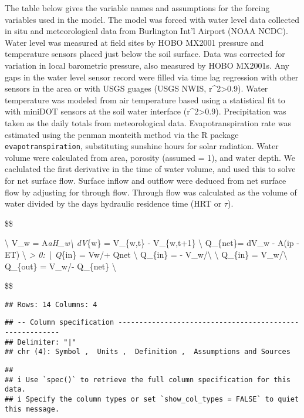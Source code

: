 \documentclass[
]{article}
\begin{document}
The table below gives the variable names and assumptions for the forcing
variables used in the model. The model was forced with water level data
collected in situ and meteorological data from Burlington Int'l Airport
(NOAA NCDC). Water level was measured at field sites by HOBO MX2001
pressure and temperature sensors placed just below the soil surface.
Data was corrected for variation in local barometric pressure, also
measured by HOBO MX2001s. Any gaps in the water level sensor record were
filled via time lag regression with other sensors in the area or with
USGS guages (USGS NWIS, r\^{}2\textgreater0.9). Water temperature was
modeled from air temperature based using a statistical fit to with
miniDOT sensors at the soil water interface (r\^{}2\textgreater0.9).
Precipitation was taken as the daily totals from meteorological data.
Evapotranspiration rate was estimated using the penman monteith method
via the R package \texttt{evapotranspiration}, substituting sunshine
hours for solar radiation. Water volume were calculated from area,
porosity (assumed = 1), and water depth. We caclulated the first
derivative in the time of water volume, and used this to solve for net
surface flow. Surface inflow and outflow were deduced from net surface
flow by adjusting for through flow. Through flow was calculated as the
volume of water divided by the days hydraulic residence time (HRT or
\(\tau\)).

\$\$

\textbackslash{} V\_w =
A\rho\emph{aH\_w\textbackslash{} dV}\{w\} = V\_\{w,t\} - V\_\{w,t+1\}
\textbackslash{} Q\_\{net\}= dV\_w - A(ip - ET) \textbackslash{}
\emph{ \textgreater{} 0: \textbackslash{} Q}\{in\}
= Vw/\tau + Qnet \textbackslash{} Q\_\{in\} = -
V\_w/\tau \textbackslash{}  \textbackslash{} Q\_\{in\} =
V\_w/\tau \textbackslash{} Q\_\{out\} = V\_w/\tau - Q\_\{net\}
\textbackslash{}

\$\$

\begin{verbatim}
## Rows: 14 Columns: 4
\end{verbatim}

\begin{verbatim}
## -- Column specification --------------------------------------------------------
## Delimiter: "|"
## chr (4): Symbol ,  Units ,  Definition ,  Assumptions and Sources
\end{verbatim}

\begin{verbatim}
## 
## i Use `spec()` to retrieve the full column specification for this data.
## i Specify the column types or set `show_col_types = FALSE` to quiet this message.
\end{verbatim}
\end{document}
